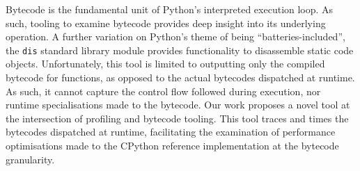 Bytecode is the fundamental unit of Python's interpreted execution loop. As such, tooling to examine bytecode provides deep insight into its underlying operation.
A further variation on Python's theme of being ``batteries-included'', the \texttt{dis} standard library module provides functionality to disassemble static code objects. Unfortunately, this tool is limited to outputting only the compiled bytecode for functions, as opposed to the actual bytecodes dispatched at runtime. As such, it cannot capture the control flow followed during execution, nor runtime specialisations made to the bytecode.
Our work proposes a novel tool at the intersection of profiling and bytecode tooling.
This tool traces and times the bytecodes dispatched at runtime, facilitating the examination of performance optimisations made to the CPython reference implementation at the bytecode granularity.

